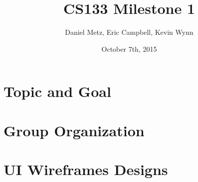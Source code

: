 \documentclass{article}
\title{CS133 Milestone 1}
\author{Daniel Metz, Eric Campbell, Kevin Wynn}
\date{October 7th, 2015}
\begin{document}
\maketitle

\section{Topic and Goal}


\section{Group Organization}


\section{UI Wireframes Designs}

\end{document}
